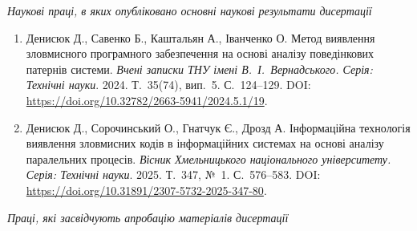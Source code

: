 \textit{Наукові праці, в яких опубліковано основні наукові результати дисертації}

\begin{enumerate}[label=\arabic*.]
\item Денисюк Д., Савенко Б., Каштальян А., Іванченко О. Метод виявлення зловмисного програмного забезпечення на основі аналізу поведінкових патернів системи. \textit{Вчені записки ТНУ імені В.~І.~Вернадського. Серія: Технічні науки}. 2024. Т.~35(74), вип.~5. С.~124--129. DOI: \url{https://doi.org/10.32782/2663-5941/2024.5.1/19}.
\item Денисюк Д., Сорочинський О., Гнатчук Є., Дрозд А. Інформаційна технологія виявлення зловмисних кодів в інформаційних системах на основі аналізу паралельних процесів. \textit{Вісник Хмельницького національного університету. Серія: Технічні науки}. 2025. Т.~347, №~1. С.~576--583. DOI: \url{https://doi.org/10.31891/2307-5732-2025-347-80}.
\end{enumerate}

\textit{Праці, які засвідчують апробацію матеріалів дисертації}

